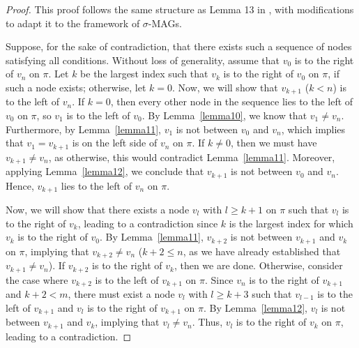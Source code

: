 \documentclass[accepted]{uai2025} %
\begin{document}
\lemmathirteen*
\begin{proof}
This proof follows the same structure as Lemma 13 in \citep{spirtes1996polynomial}, with modifications to adapt it to the framework of \( \sigma \)-MAGs.

Suppose, for the sake of contradiction, that there exists such a sequence of nodes satisfying all conditions. Without loss of generality, assume that \( v_0 \) is to the right of \( v_n \) on \( \pi \). Let \( k \) be the largest index such that \( v_k \) is to the right of \( v_0 \) on \( \pi \), if such a node exists; otherwise, let \( k = 0 \). Now, we will show that \( v_{k+1} \) ($k<n$) is to the left of \( v_n \). If \( k = 0 \), then every other node in the sequence lies to the left of \( v_0 \) on \( \pi \), so \( v_1 \) is to the left of \( v_0 \). By Lemma~\ref{lemma10}, we know that \( v_1 \neq v_n \). Furthermore, by Lemma~\ref{lemma11}, \( v_1 \) is not between \( v_0 \) and \( v_n \), which implies that \( v_1 = v_{k+1} \) is on the left side of \( v_n \) on \( \pi \). If \( k \neq 0 \), then we must have \( v_{k+1} \neq v_n \), as otherwise, this would contradict Lemma~\ref{lemma11}. Moreover, applying Lemma~\ref{lemma12}, we conclude that \( v_{k+1} \) is not between \( v_0 \) and \( v_n \). Hence, \( v_{k+1} \) lies to the left of \( v_n \) on \( \pi \).  

Now, we will show that there exists a node \( v_l \) with \( l \geq k+1 \) on \( \pi \) such that \( v_l \) is to the right of \( v_k \), leading to a contradiction since \( k \) is the largest index for which \( v_k \) is to the right of \( v_0 \). By Lemma~\ref{lemma11}, \( v_{k+2} \) is not between \( v_{k+1} \) and \( v_k \) on \( \pi \), implying that \( v_{k+2} \neq v_n \) (\( k+2 \leq n \), as we have already established that \( v_{k+1} \neq v_n \)). If \( v_{k+2} \) is to the right of \( v_k \), then we are done. Otherwise, consider the case where \( v_{k+2} \) is to the left of \( v_{k+1} \) on \( \pi \). Since \( v_n \) is to the right of \( v_{k+1} \) and $k+2<m$, there must exist a node \( v_l \) with \( l \geq k+3 \) such that \( v_{l-1} \) is to the left of \( v_{k+1} \) and \( v_l \) is to the right of \( v_{k+1} \) on \( \pi \). By Lemma~\ref{lemma12}, \( v_l \) is not between \( v_{k+1} \) and \( v_k \), implying that \( v_l \neq v_n \). Thus, \( v_l \) is to the right of \( v_k \) on \( \pi \), leading to a contradiction. 
\end{proof}



\end{document}
